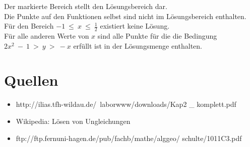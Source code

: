 Der markierte Bereich stellt den Lösungsbereich dar. \\
Die Punkte auf den Funktionen selbst sind nicht im Lösungsbereich enthalten. \\
Für den Bereich $ -1 \ \leq \ x \ \leq \ \frac 1 2 $ existiert keine Lösung. \\
Für alle anderen Werte von $x$ sind alle Punkte für die die Bedingung
$ 2x^2 \ - \ 1 \ > \ y \ > \ -x $ erfüllt ist in der Lösungsmenge enthalten.

\section{Quellen} 

\begin{itemize}
\item http://ilias.tfh-wildau.de/~laborwww/downloads/Kap2 \_ komplett.pdf
\item Wikipedia: Lösen von Ungleichungen
\item ftp://ftp.fernuni-hagen.de/pub/fachb/mathe/alggeo/ \linebreak schulte/1011C3.pdf
\end{itemize}
